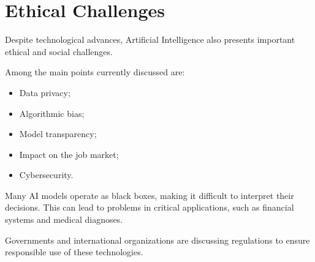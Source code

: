 \section{Ethical Challenges}

Despite technological advances, Artificial Intelligence also presents important ethical and
social challenges.

Among the main points currently discussed are:

\begin{itemize}
    \item Data privacy;
    \item Algorithmic bias;
    \item Model transparency;
    \item Impact on the job market;
    \item Cybersecurity.
\end{itemize}

Many AI models operate as black boxes, making it difficult to interpret their decisions.
This can lead to problems in critical applications, such as financial systems and medical
diagnoses.

Governments and international organizations are discussing regulations to ensure responsible
use of these technologies. 